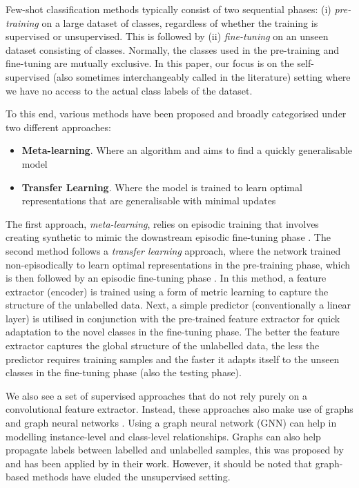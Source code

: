 Few-shot classification methods typically consist of two sequential phases: (i) \textit{pre-training} on a large dataset of  classes, regardless of whether the training is supervised or unsupervised. This is followed by (ii) \textit{fine-tuning} on an unseen dataset consisting of  classes. Normally, the classes used in the pre-training and fine-tuning are mutually exclusive. In this paper, our focus is on the self-supervised (also sometimes interchangeably called  in the literature) setting where we have no access to the actual class labels of the  dataset.

To this end, various methods have been proposed and broadly categorised under two different approaches:
\begin{itemize}
    \item \textbf{Meta-learning}. Where an algorithm  and aims to find a quickly generalisable model
    \item \textbf{Transfer Learning}. Where the model is trained to learn optimal representations that are generalisable with minimal updates
\end{itemize}

The first approach, \textit{meta-learning}, relies on episodic training that involves creating synthetic  to mimic the downstream episodic fine-tuning phase \parencite{Finn2017Model-agnosticNetworks, Hsu2018UnsupervisedMeta-Learning, Khodadadeh2018UnsupervisedClassification, Antoniou2019AssumeAugmentation, Ye2022, lee2021meta, Ji2019UnsupervisedTraining}. 
The second method follows a \textit{transfer learning} approach, where the network trained non-episodically to learn optimal representations in the pre-training phase, which is then followed by an episodic fine-tuning phase \parencite{Medina2020Self-SupervisedClassification, goodemballneed2020, dhillon2019baseline}.
In this method, a feature extractor (encoder) is trained using a form of metric learning to capture the structure of the unlabelled data. 
Next, a simple predictor (conventionally a linear layer) is utilised in conjunction with the pre-trained feature extractor for quick adaptation to the novel classes in the fine-tuning phase.
The better the feature extractor captures the global structure of the unlabelled data, the less the predictor requires training samples and the faster it adapts itself to the unseen classes in the fine-tuning phase (also the testing phase).

We also see a set of supervised approaches that do not rely purely on a convolutional feature extractor. Instead, these approaches also make use of graphs and graph neural networks \parencite{garcia2018fewshot, kim2019edge, yu2022hybrid, yang2020dpgn}. Using a graph neural network (GNN) can help in modelling instance-level and class-level relationships. Graphs can also help propagate labels between labelled and unlabelled samples, this was proposed by \textcite{xiaojin2002learning} and has been applied by \textcite{liu2018learning} in their work. However, it should be noted that graph-based methods have eluded the unsupervised setting.

